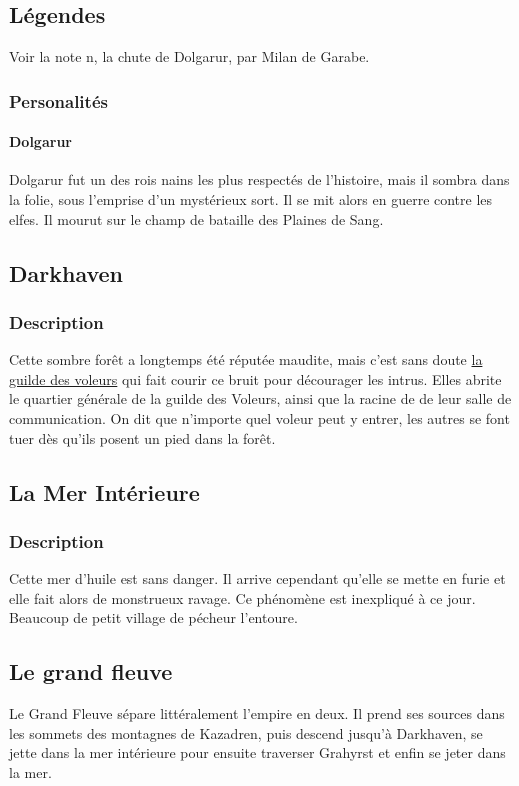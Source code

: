 \subsection{Légendes}
Voir la note n, la chute de Dolgarur, par Milan de Garabe.
\subsubsection{Personalités}
\paragraph{Dolgarur}
\hypertarget {dolgarur}{}Dolgarur fut un des rois nains les plus respectés de l'histoire, mais il sombra dans la folie, sous l'emprise d'un mystérieux sort. 
Il se mit alors en guerre contre les elfes. 
Il mourut sur le champ de bataille des Plaines de Sang.
\subsection{Darkhaven}
\subsubsection{Description}
\hypertarget{darkhaven}{}Cette sombre forêt a longtemps été réputée maudite,
mais c'est sans doute \hyperlink{laguildedesvoleurs}{la guilde des voleurs} qui fait courir ce bruit pour décourager les intrus.
Elles abrite le quartier générale de la guilde des Voleurs, ainsi que la racine de de leur salle de communication. 
On dit que n'importe quel voleur peut y entrer, les autres se font tuer dès qu'ils posent un pied dans la forêt.
\subsection{La Mer Intérieure}
\subsubsection{Description}
\hypertarget {lamerinterieure}{}Cette mer d'huile est sans danger.
Il arrive cependant qu’elle se mette en furie et elle fait alors de monstrueux ravage.
Ce phénomène est inexpliqué à ce jour.
Beaucoup de petit village de pécheur l'entoure.
\subsection{Le grand fleuve}
Le Grand Fleuve sépare littéralement l'empire en deux. Il prend ses sources dans les sommets des montagnes de Kazadren, puis descend jusqu'à Darkhaven, se jette dans la mer intérieure pour ensuite traverser Grahyrst et enfin se jeter dans la mer.
